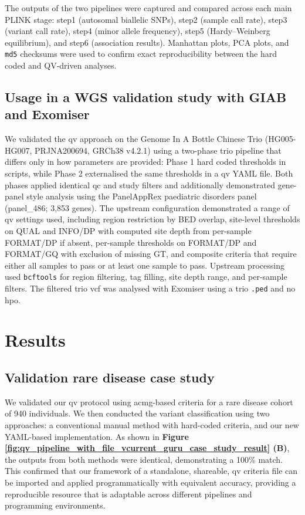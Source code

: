 The outputs of the two pipelines were captured and compared across each main PLINK stage: step1 (autosomal biallelic SNPs), step2 (sample call rate), step3 (variant call rate), step4 (minor allele frequency), step5 (Hardy–Weinberg equilibrium), and step6 (association results). Manhattan plots, PCA plots, and \texttt{md5} checksums were used to confirm exact reproducibility between the hard coded and QV-driven analyses.

\subsection{Usage in a WGS validation study with GIAB and Exomiser}

We validated the \ac{qv} approach on the Genome In A Bottle Chinese Trio (HG005-HG007, PRJNA200694, GRCh38 v4.2.1) using a two-phase trio pipeline that differs only in how parameters are provided: Phase 1 hard coded thresholds in scripts, while Phase 2 externalised the same thresholds in a \ac{qv} YAML file. Both phases applied identical \ac{qc} and study filters and additionally demonstrated gene-panel style analysis using the PanelAppRex paediatric disorders panel (panel\_486; 3{,}853 genes). The upstream configuration demonstrated a range of \ac{qv} settings used, including region restriction by BED overlap, site-level thresholds on QUAL and INFO/DP with computed site depth from per-sample FORMAT/DP if absent, per-sample thresholds on FORMAT/DP and FORMAT/GQ with exclusion of missing GT, and composite criteria that require either all samples to pass or at least one sample to pass. Upstream processing used \texttt{bcftools} for region filtering, tag filling, site depth range, and per-sample filters. The filtered trio \ac{vcf} was analysed with Exomiser using a trio \texttt{.ped} and no \ac{hpo}. 

\section{Results}
\subsection{Validation rare disease case study}

We validated our \ac{qv} protocol using \ac{acmg}-based criteria for a rare disease cohort of 940 individuals. 
We then conducted the variant classification using two approaches: a conventional manual method with hard-coded criteria, and our new YAML-based implementation.
As shown in \textbf{Figure \ref{fig:qv_pipeline_with_file_vcurrent_guru_case_study_result} (B)}, 
the outputs from both methods were identical, demonstrating a 100\% match. This confirmed that our framework of a standalone, shareable, \ac{qv} criteria file can be imported and applied programmatically with equivalent accuracy, providing a reproducible resource that is adaptable across different pipelines and programming environments.

